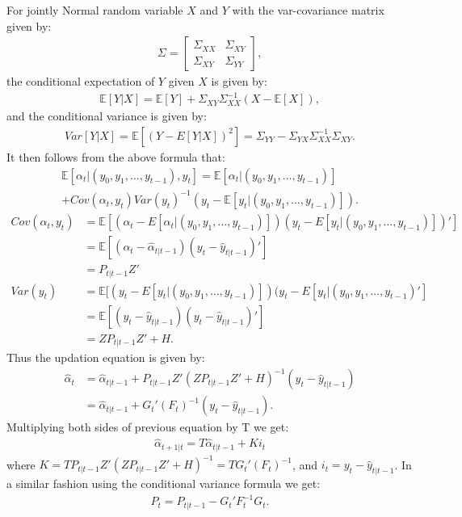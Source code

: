 \documentclass[12pt]{article}
\begin{document}
For jointly Normal random variable $X$ and $Y$ with the var-covariance matrix given by:
\begin{align*}
\Sigma = \begin{bmatrix}
\Sigma_{XX} & \Sigma_{XY} \\
\Sigma_{XY} & \Sigma_{YY}
\end{bmatrix},
\end{align*}
the conditional expectation of $Y$ given $X$ is given by:
\begin{align*}
\mathbb{E}[Y|X] = \mathbb{E}[Y] + \Sigma_{XY} \Sigma_{XX}^{-1}(X - \mathbb{E}[X]),
\end{align*}
and the conditional variance is given by:
\begin{align*}
Var[Y|X] = \mathbb{E}[(Y - E[Y|X])^2] = \Sigma_{YY} - \Sigma_{YX}\Sigma_{XX}^{-1}\Sigma_{XY}.
\end{align*}
It then follows from the above formula that:
\begin{multline*}
\mathbb{E}[\alpha_t| (y_0, y_1, \dots, y_{t-1}), y_t] = \mathbb{E}[\alpha_t|(y_0, y_1, \dots, y_{t-1})] \\
+ Cov(\alpha_t, y_t)Var(y_t)^{-1}(y_t - \mathbb{E}[y_t | (y_0, y_1, \dots, y_{t-1})]).
\end{multline*}
\begin{align*}
Cov(\alpha_t, y_t ) &  = \mathbb{E}[(\alpha_t - E[\alpha_t|(y_0, y_1, \dots, y_{t-1})])(y_t - E[y_t | (y_0, y_1, \dots, y_{t-1})])']\\
& = \mathbb{E}[(\alpha_t - \hat{\alpha}_{t|t-1})(y_t - \hat{y}_{t|t-1})']\\
& = P_{t|t-1}Z' \\
Var(y_t) & = \mathbb{E}[(y_t - E[y_t|(y_0, y_1, \dots, y_{t-1})])(y_t - E[y_t|(y_0, y_1, \dots, y_{t-1})']\\
& = \mathbb{E}[(y_t - \hat{y}_{t|t-1})(y_t - \hat{y}_{t|t-1} )']\\
& = ZP_{t|t-1}Z' + H.
\end{align*}
Thus the updation equation is given by:
\begin{align*}
\hat{\alpha}_t & = \hat{\alpha}_{t|t-1} + P_{t|t-1}Z'(ZP_{t|t-1}Z' + H)^{-1}(y_t - \hat{y}_{t|t-1})\\
& =  \hat{\alpha}_{t|t-1} + G_t' (F_t)^{-1}(y_t - \hat{y}_{t|t-1}).
\end{align*}
Multiplying both sides of previous equation by T we get:
\begin{align*}
\hat{\alpha}_{t+1|t} = T\hat{\alpha}_{t|t-1} + K i_t
\end{align*}
where $K = TP_{t|t-1}Z'(ZP_{t|t-1}Z' + H)^{-1} = T G_t' (F_t)^{-1}$, and $i_t = y_t - \hat{y}_{t|t-1}$.
In a similar fashion using the conditional variance formula we get:
\begin{align*}
P_t = P_{t|t-1} - G_t'F_t^{-1}G_t.
\end{align*}
\end{document}
